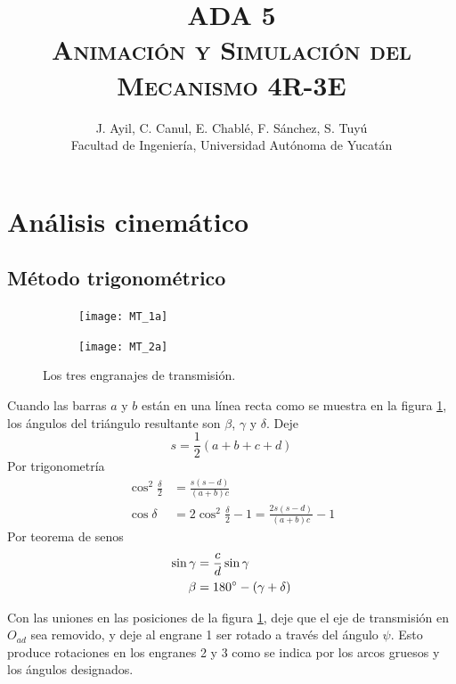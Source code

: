 \documentclass[12pt, final]{extarticle}
\title{ADA 5\\
\textsc{Animación y Simulación del Mecanismo 4R-3E}}
\author{J. Ayil, C. Canul, E. Chablé, F. Sánchez, S. Tuyú\\
{Facultad de Ingeniería, Universidad Autónoma de Yucatán}}
\date{}
\begin{document}
\maketitle

\begin{abstract}
    \blindtext
\end{abstract}

\section{Análisis cinemático}
\subsection{Método trigonométrico}
\begin{figure}[ht]
    \centering
    \begin{subfigure}[b]{0.45\textwidth}
        \centering
        \texttt{[image: MT\_1a]}
        \caption{}
        \label{Fig: Los tres engranajes de transmision a}
    \end{subfigure}
    \hfill
    \begin{subfigure}[b]{0.45\textwidth}
        \centering
        \texttt{[image: MT\_2a]}
        \caption{}
        \label{Fig: Los tres engranajes de transmision b}
    \end{subfigure}
    \caption{Los tres engranajes de transmisión.}
    \label{Fig: Los tres engranajes de transmision}
\end{figure}

Cuando las barras $a$ y $b$ están en una línea recta como se muestra en la
figura \ref{Fig: Los tres engranajes de transmision a}, los ángulos del
triángulo resultante son $\beta$, $\gamma$ y $\delta$. Deje
\begin{equation}
    s = \frac{1}{2}(a + b + c + d)
\end{equation}
Por trigonometría
\begin{align}
    \cos^2 \frac{\delta}{2} &= \frac{s(s - d)}{(a + b)c} \\
    \cos \delta &= 2\cos^2 \frac{\delta}{2} - 1 = \frac{2s(s - d)}{(a + b)c} - 1
\end{align}
Por teorema de senos
\begin{align}
    \sin \gamma &= \frac{c}{d}\sin\gamma \\
    \beta &= 180\degree - (\gamma + \delta)
\end{align}

Con las uniones en las posiciones de la figura
\ref{Fig: Los tres engranajes de transmision a}, deje que el eje de
transmisión en $O_{ad}$ sea removido, y deje al engrane 1 ser rotado a través
del ángulo $\psi$. Esto produce rotaciones en los engranes 2 y 3 como se indica
por los arcos gruesos y los ángulos designados.
\end{document}
